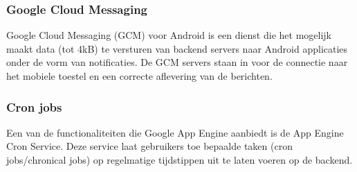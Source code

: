 \subsubsection{Google Cloud Messaging~\cite{Google_Cloud_Messaging}}

Google Cloud Messaging (GCM) voor Android is een dienst die het mogelijk maakt data (tot 4kB) te versturen van backend servers naar Android applicaties onder de vorm van notificaties. De GCM servers staan in voor de connectie naar het mobiele toestel en een correcte aflevering van de berichten.

\subsubsection{Cron jobs~\cite{Google_Cron_Jobs}}

Een van de functionaliteiten die Google App Engine aanbiedt is de App Engine Cron Service. Deze service laat gebruikers toe bepaalde taken (cron jobs/chronical jobs) op regelmatige tijdstippen uit te laten voeren op de backend.\\\\


